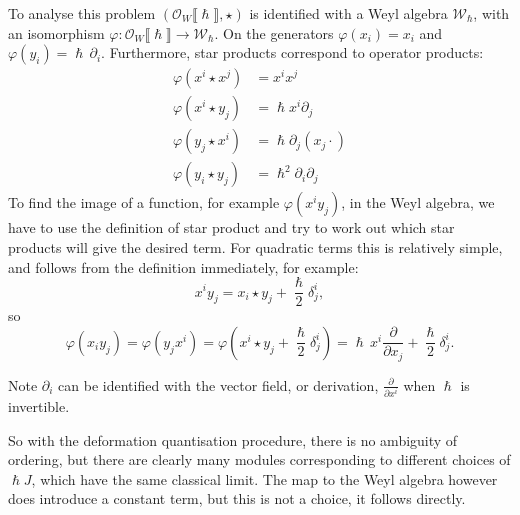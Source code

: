     To analyse this problem \( (\mathcal{O}_{W} \lBrack \hslash \rBrack, \star) \) is identified with a Weyl algebra \( \mathcal{W}_{\hslash}\), with an isomorphism \( \varphi :\mathcal{O}_{W} \lBrack \hslash \rBrack \rightarrow \mathcal{W}_{\hslash} \). On the generators \(\varphi( x_i) = x_i \) and \( \varphi(y_i) = \hslash\, \partial_i \). Furthermore, star products correspond to operator products:
    \begin{align*}
         \varphi(x^i \star x^j) &= x^i x^j \\
         \varphi(x^i \star y_j) &= \hslash x^i  \partial_j \\
         \varphi(y_j \star x^i) &= \hslash \partial_j ( x_j \cdot ) \\ 
        \varphi( y_i \star y_j) &= \hslash^2 \partial_i \partial_j  
    \end{align*}
    To find the image of a function, for example \(\varphi( x^i y_j)\), in the Weyl algebra, we have to use the definition of star product and try to work out which star products will give the desired term. For quadratic terms this is relatively simple, and follows from the definition immediately, for example:
    \[ x^i y_j = x_i \star y_j + \frac{\hslash}{2} \delta_{j}^i,\]
    so 
    \[ \varphi(x_i y_j ) = \varphi(y_j x^i) = \varphi\left(x^i \star y_j + \frac{\hslash}{2} \delta_{j}^i \right) = \hslash\, x^i \frac{\partial}{\partial x_j} + \frac{\hslash}{2} \delta_{j}^i.\] 
    \begin{rem}
    Note \(\partial_i \) can be identified with the vector field, or derivation, \( \frac{\partial}{\partial x^i}\) when \( \hslash \) is invertible.  
    \end{rem}
    So with the deformation quantisation procedure, there is no ambiguity of ordering, but there are clearly many modules corresponding to different choices of \(\hslash J\), which have the same classical limit. The map to the Weyl algebra however does introduce a constant term, but this is not a choice, it follows directly.
    
